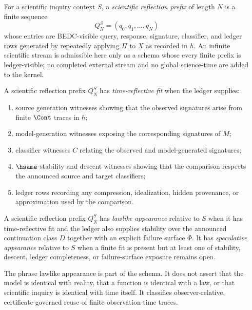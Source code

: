 \begin{definition}
\label{def:scientific-reflection-prefix}
For a scientific inquiry context $S$, a \emph{scientific reflection
prefix} of length $N$ is a finite sequence
$$
Q^{S}_{N}=(q_{0},q_{1},\ldots,q_{N})
$$
whose entries are BEDC-visible query, response, signature, classifier,
and ledger rows generated by repeatedly applying $\Pi$ to $X$ as recorded
in $h$. An infinite scientific stream is admissible here only as a schema
whose every finite prefix is ledger-visible; no completed external stream
and no global science-time are added to the kernel.
\end{definition}

\begin{definition}
\label{def:time-reflective-fit}
A scientific reflection prefix $Q^{S}_{N}$ has \emph{time-reflective fit}
when the ledger supplies:
\begin{enumerate}
\item source generation witnesses showing that the observed signatures
arise from finite $\Cont$ traces in $h$;
\item model-generation witnesses exposing the corresponding signatures of
$M$;
\item classifier witnesses $C$ relating the observed and model-generated
signatures;
\item $\hsame$-stability and descent witnesses showing that the comparison
respects the announced source and target classifiers;
\item ledger rows recording any compression, idealization, hidden
provenance, or approximation used by the comparison.
\end{enumerate}
\end{definition}

\begin{definition}
\label{def:lawlike-speculative-appearance}
A scientific reflection prefix $Q^{S}_{N}$ has \emph{lawlike appearance}
relative to $S$ when it has time-reflective fit and the ledger also
supplies stability over the announced continuation class $D$ together
with an explicit failure surface $\Phi$. It has \emph{speculative
appearance} relative to $S$ when a finite fit is present but at least one
of stability, descent, ledger completeness, or failure-surface exposure
remains open.

The phrase lawlike appearance is part of the schema. It does not assert
that the model is identical with reality, that a function is identical
with a law, or that scientific inquiry is identical with time itself. It
classifies observer-relative, certificate-governed reuse of finite
observation-time traces.
\end{definition}


